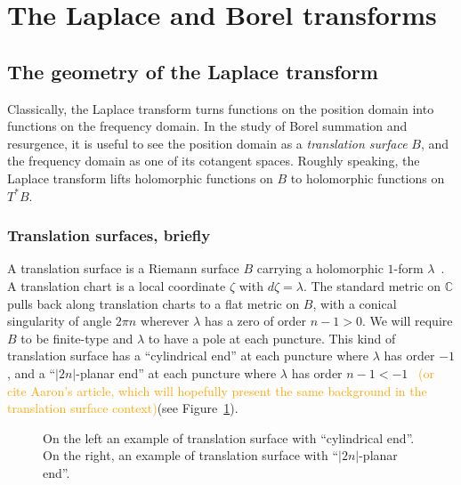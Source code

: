 \documentclass{article}
\newcommand{\C}{\mathbb{C}}
\theoremstyle{definition}
\theoremstyle{plain}
\begin{document}
\section{The Laplace and Borel transforms}\label{sec:Laplace-Borel-general}
\subsection{The geometry of the Laplace transform}
Classically, the Laplace transform turns functions on the position domain into functions on the frequency domain. In the study of Borel summation and resurgence, it is useful to see the position domain as a {\em translation surface} $B$, and the frequency domain as one of its cotangent spaces. Roughly speaking, the Laplace transform lifts holomorphic functions on $B$ to holomorphic functions on $T^*B$.
%
\subsubsection{Translation surfaces, briefly}
%
A translation surface is a Riemann surface $B$ carrying a holomorphic $1$-form $\lambda$~\cite{zorich2006flat}. A translation chart is a local coordinate $\zeta$ with $d\zeta = \lambda$. The standard metric on $\C$ pulls back along translation charts to a flat metric on $B$, with a conical singularity of angle $2\pi n$ wherever $\lambda$ has a zero of order $n-1 > 0$. We will require $B$ to be finite-type and $\lambda$ to have a pole at each puncture. This kind of translation surface has a ``cylindrical end'' at each puncture where $\lambda$ has order $-1$, and a ``$|2n|$-planar end'' at each puncture where $\lambda$ has order $n-1 < -1$~\cite[Section 2.5]{gupta2013meromorphic} \textcolor{orange}{(or cite Aaron's article, which will hopefully present the same background in the translation surface context)}(see Figure~\ref{fig:translation_surface}).
\begin{figure}[ht]
    \centering
    \caption{On the left an example of translation surface with ``cylindrical end''. On the right, an example of translation surface with  ``$|2n|$-planar end''. }
    \label{fig:translation_surface}
\end{figure}
%
\end{document}
